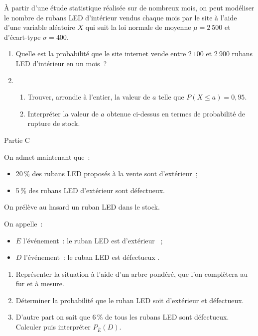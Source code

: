 À partir d'une étude statistique réalisée sur de nombreux mois, on peut modéliser le nombre de rubans LED d'intérieur vendus chaque mois par le site à l'aide d'une variable aléatoire $X$ qui suit la loi normale de moyenne $\mu = 2~500$ et d'écart-type $\sigma=400$.
\begin{enumerate}
     \item Quelle est la probabilité que le site internet vende entre $2~100$ et $2~900$ rubans LED d'intérieur en un mois~?
     \item
     \begin{enumerate}[label=\alph*.]
          \item Trouver, arrondie à l'entier, la valeur de $a$ telle que $P(X \leqslant a)=0,95$.
          \item Interpréter la valeur de $a$ obtenue ci-dessus en termes de probabilité de rupture de stock.
     \end{enumerate}
\end{enumerate}
\begin{center}\begin{h3}Partie C \end{h3}\end{center}
On admet maintenant que~:
\begin{itemize}
     \item 20\,\% des rubans LED proposés à la vente sont d'extérieur~;
     \item 5\,\% des rubans LED d'extérieur sont défectueux.
\end{itemize}
On prélève au hasard un ruban LED dans le stock.
\par
On appelle~:
\begin{itemize}
     \item $E$ l'événement~: \og le ruban LED est d'extérieur \fg{}~;
     \item $D$ l'événement~: \og le ruban LED est défectueux \fg{}.
\end{itemize}
\begin{enumerate}
     \item Représenter la situation à l'aide d'un arbre pondéré, que l'on complètera au fur et à mesure.
     \item Déterminer la probabilité que le ruban LED soit d'extérieur et défectueux.
     \item D'autre part on sait que 6\,\% de tous les rubans LED sont défectueux. \\
     Calculer puis interpréter $P_{\overline{E}}(D)$.
\end{enumerate}

